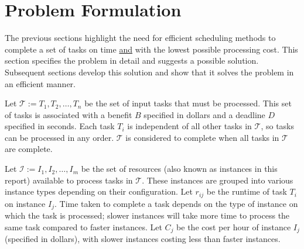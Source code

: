 \documentclass[12pt]{report}
\begin{document}

\section{Problem Formulation}

The previous sections highlight the need for efficient scheduling methods to complete a set of tasks on time \underline{and} with the lowest possible processing cost.
This section specifies the problem in detail and suggests a possible solution.
Subsequent sections develop this solution and show that it solves the problem in an efficient manner.

Let $\mathcal{T} := {T_1, T_2, \dots, T_n}$ be the set of input tasks that must be processed.
This set of tasks is associated with a benefit $B$ specified in dollars and a deadline $D$ specified in seconds.
Each task $T_i$ is independent of all other tasks in $\mathcal{T}$, so tasks can be processed in any order.
$\mathcal{T}$ is considered to complete when all tasks in $\mathcal{T}$ are complete.

Let $\mathcal{I} := {I_1, I_2, \dots, I_m}$ be the set of resources (also known as instances in this report) available to process tasks in $\mathcal{T}$.
These instances are grouped into various instance types depending on their configuration.
Let $r_{ij}$ be the runtime of task $T_i$ on instance $I_j$.
Time taken to complete a task depends on the type of instance on which the task is processed; slower instances will take more time to process the same task compared to faster instances.
Let $C_j$ be the cost per hour of instance $I_j$ (specified in dollars), with slower instances costing less than faster instances.
\end{document}
